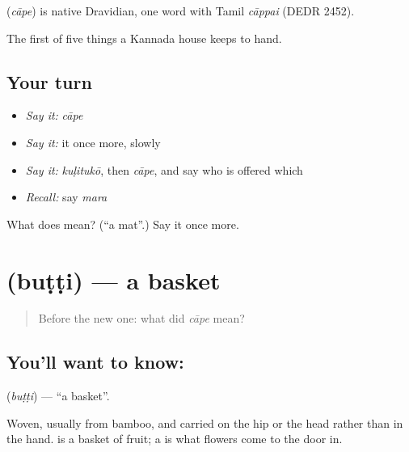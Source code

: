 \begin{cousinweb}
\textbf{} (\emph{cāpe}) is native Dravidian, one word with Tamil \emph{cāppai} (DEDR 2452).
\end{cousinweb}

\begin{grammarlens}[title={What you've built}]
The first of five things a Kannada house keeps to hand.
\end{grammarlens}

\subsection*{Your turn}
\begin{itemize}
\raggedright
  \item \emph{Say it:} \emph{cāpe}
  \item \emph{Say it:} it once more, slowly
  \item \emph{Say it:} \emph{kuḷitukō}, then \emph{cāpe}, and say who is offered which
  \item \emph{Recall:} say \emph{mara}
\end{itemize}

\begin{tcolorbox}[breakable,colback=teal!4,colframe=teal!35!black,title={Before you move on}]
What does  mean? (\textquotedblleft{}a mat\textquotedblright{}.) Say it once more.
\end{tcolorbox}
\section[\texorpdfstring{\kn{ಬುಟ್ಟಿ} (buṭṭi)}{ಬುಟ್ಟಿ (buṭṭi)}]{ (buṭṭi) — a basket}

\label{lesson:KA-C56-basket}



\begin{quote}
Before the new one: what did \emph{cāpe} mean?
\end{quote}

\subsection*{You'll want to know: }
\textbf{} (\emph{buṭṭi}) — \textquotedblleft{}a basket\textquotedblright{}.

Woven, usually from bamboo, and carried on the hip or the head rather than in the hand.   is a basket of fruit; a   is what flowers come to the door in.

